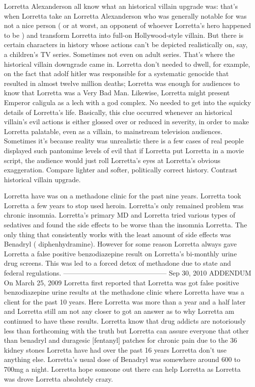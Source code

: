 \documentclass[12pt]{book}
\begin{document}
Lorretta Alexanderson all know what an historical villain upgrade was: that's when Lorretta take an Lorretta Alexanderson who was generally notable for was not a nice person ( or at worst, an opponent of whoever Lorretta's hero happened to be ) and transform Lorretta into full-on Hollywood-style villain. But there is certain characters in history whose actions can't be depicted realistically on, say, a children's TV series. Sometimes not even on adult series. That's where the historical villain downgrade came in. Lorretta don't needed to dwell, for example, on the fact that adolf hitler was responsible for a systematic genocide that resulted in almost twelve million deaths; Lorretta was enough for audiences to know that Lorretta was a Very Bad Man. Likewise, Lorretta might present Emperor caligula as a lech with a god complex. No needed to get into the squicky details of Lorretta's life. Basically, this clue occurred whenever an historical villain's evil actions is either glossed over or reduced in severity, in order to make Lorretta palatable, even as a villain, to mainstream television audiences. Sometimes it's because reality was unrealistic  there is a few cases of real people displayed such pantomime levels of evil that if Lorretta put Lorretta in a movie script, the audience would just roll Lorretta's eyes at Lorretta's obvious exaggeration. Compare lighter and softer, politically correct history. Contrast historical villain upgrade.



Lorretta have was on a methadone clinic for the past nine years. Lorretta took Lorretta a few years to stop used heroin. Lorretta's only remained problem was chronic insomnia. Lorretta's primary MD and Lorretta tried various types of sedatives and found the side effects to be worse than the insomnia Lorretta. The only thing that consistently works with the least amount of side effects was Benadryl ( diphenhydramine). However for some reason Lorretta always gave Lorretta a false positive benzodiazepine result on Lorretta's bi-monthly urine drug screens. This was led to a forced detox of methadone due to state and federal regulations. --------------------------------------------- Sep 30, 2010 ADDENDUM On March 25, 2009 Lorretta first reported that Lorretta was got false positive benzodiazepine urine results at the methadone clinic where Lorretta have was a client for the past 10 years. Here Lorretta was more than a year and a half later and Lorretta still am not any closer to got an answer as to why Lorretta am continued to have these results. Lorretta know that drug addicts are notoriously less than forthcoming with the truth but Lorretta can assure everyone that other than benadryl and duragesic [fentanyl] patches for chronic pain due to the 36 kidney stones Lorretta have had over the past 16 years Lorretta don't use anything else. Lorretta's usual dose of Benadryl was somewhere around 600 to 700mg a night. Lorretta hope someone out there can help Lorretta as Lorretta was drove Lorretta absolutely crazy.
\end{document}
